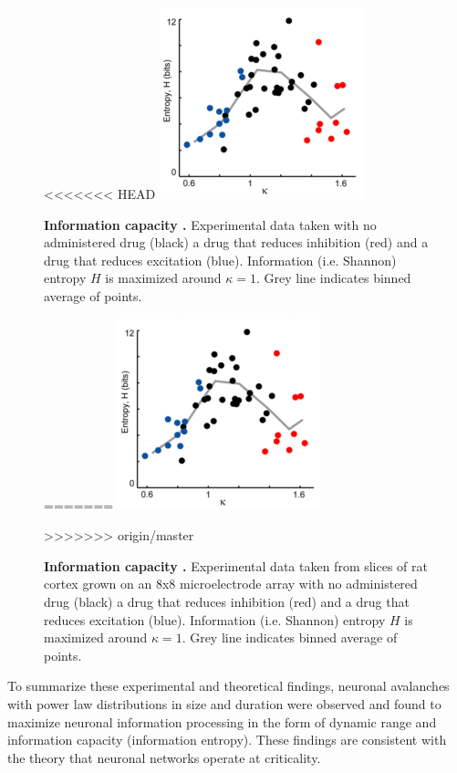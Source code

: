 \documentclass[12pt]{article}
\begin{document}
\begin{figure}      
  \begin{center}    
<<<<<<< HEAD
 \includegraphics[width=.45\textwidth]{entropyplenz}    
    \caption{\textbf{Information capacity \cite{Shew2011a}.} Experimental data taken with no administered drug (black) a drug that reduces inhibition (red) and a drug that reduces excitation (blue). Information (i.e. Shannon) entropy $H$ is maximized around $\kappa = 1$. Grey line indicates binned average of points.}
=======
 \includegraphics[width=.50\textwidth]{entropyplenz}    
    \caption{\textbf{Information capacity \cite{Shew2011a}.} Experimental data taken from slices of rat cortex grown on an 8x8 microelectrode array with no administered drug (black) a drug that reduces inhibition (red) and a drug that reduces excitation (blue). Information (i.e. Shannon) entropy $H$ is maximized around $\kappa = 1$. Grey line indicates binned average of points.}
>>>>>>> origin/master
   \label{Figure::Entropy / information maximized experimental}   
  \end{center}     
   \end{figure}

To summarize these experimental and theoretical findings, neuronal avalanches with power law distributions in size and duration were observed and found to maximize neuronal information processing in the form of dynamic range and information capacity (information entropy). These findings are consistent with the theory that neuronal networks operate at criticality. 
\end{document}
